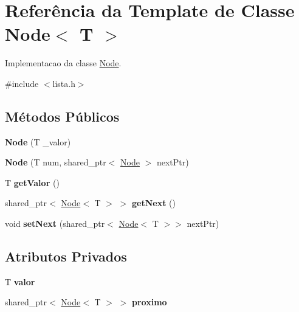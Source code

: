 \hypertarget{classNode}{}\section{Referência da Template de Classe Node$<$ T $>$}
\label{classNode}


Implementacao da classe \hyperlink{classNode}{Node}.  




{\ttfamily \#include $<$lista.\+h$>$}

\subsection*{Métodos Públicos}
\begin{DoxyCompactItemize}
\item 
{\bfseries Node} (T \+\_\+valor)\hypertarget{classNode_ae00c7c803c5b2fea3b2270050da4a9db}{}\label{classNode_ae00c7c803c5b2fea3b2270050da4a9db}

\item 
{\bfseries Node} (T num, shared\+\_\+ptr$<$ \hyperlink{classNode}{Node} $>$ next\+Ptr)\hypertarget{classNode_af67f09d322ec9a1fc2852ff98f0a4558}{}\label{classNode_af67f09d322ec9a1fc2852ff98f0a4558}

\item 
T {\bfseries get\+Valor} ()\hypertarget{classNode_aac9fa54166ff3aa269de6da8f9484f66}{}\label{classNode_aac9fa54166ff3aa269de6da8f9484f66}

\item 
shared\+\_\+ptr$<$ \hyperlink{classNode}{Node}$<$ T $>$ $>$ {\bfseries get\+Next} ()\hypertarget{classNode_a85f16577c580d8fdc246f350c5a6141a}{}\label{classNode_a85f16577c580d8fdc246f350c5a6141a}

\item 
void {\bfseries set\+Next} (shared\+\_\+ptr$<$ \hyperlink{classNode}{Node}$<$ T $>$$>$ next\+Ptr)\hypertarget{classNode_a73ec6e581244130c98a26ed2935cf472}{}\label{classNode_a73ec6e581244130c98a26ed2935cf472}

\end{DoxyCompactItemize}
\subsection*{Atributos Privados}
\begin{DoxyCompactItemize}
\item 
T {\bfseries valor}\hypertarget{classNode_ae7133548e1ffddfd6bab32e684094dbe}{}\label{classNode_ae7133548e1ffddfd6bab32e684094dbe}

\item 
shared\+\_\+ptr$<$ \hyperlink{classNode}{Node}$<$ T $>$ $>$ {\bfseries proximo}\hypertarget{classNode_a26c14ea34fca953ae3f847245c3e9caa}{}\label{classNode_a26c14ea34fca953ae3f847245c3e9caa}

\end{DoxyCompactItemize}
